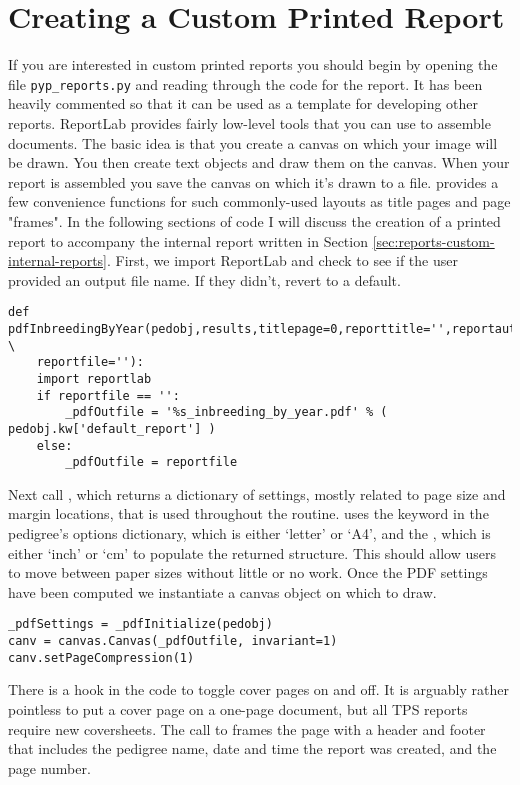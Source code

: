 \section{Creating a Custom Printed Report}
\label{sec:reports-custom-printed-reports}
If you are interested in custom printed reports you should begin by opening the file \texttt{pyp\_reports.py} and reading
through the code for the  report.  It has been heavily commented so that it can be used as
a template for developing other reports.  ReportLab provides fairly low-level tools that you can use to assemble
documents.  The basic idea is that you create a canvas on which your image will be drawn.  You then create text objects and
draw them on the canvas.  When your report is assembled you save the canvas on which it's drawn to a file.  \PyPedal{} provides
a few convenience functions for such commonly-used layouts as title pages and page "frames".  In the following sections of code I will discuss the creation of a  printed report to accompany the
 internal report written in Section \ref{sec:reports-custom-internal-reports}.  First, we import ReportLab and check to see if the user provided an output file name.  If they didn't, revert to a default.
\begin{verbatim}
def pdfInbreedingByYear(pedobj,results,titlepage=0,reporttitle='',reportauthor='', \
    reportfile=''):
    import reportlab
    if reportfile == '':
        _pdfOutfile = '%s_inbreeding_by_year.pdf' % ( pedobj.kw['default_report'] )
    else:
        _pdfOutfile = reportfile
\end{verbatim}
Next call , which returns a dictionary of settings, mostly related to page size and
margin locations, that is used throughout the routine.  \function{\_pdfInitialize()} uses the  keyword
in the pedigree's options dictionary, which is either `letter' or `A4', and the \member{default\_unit}, which is either
`inch' or `cm' to populate the returned structure.  This should allow users to move between paper sizes without little
or no work.  Once the PDF settings have been computed we instantiate a canvas object on which to draw.
\begin{verbatim}
_pdfSettings = _pdfInitialize(pedobj)
canv = canvas.Canvas(_pdfOutfile, invariant=1)
canv.setPageCompression(1)
\end{verbatim}
There is a hook in the code to toggle cover pages on and off.  It is arguably rather pointless to put a cover page on a one-page document, but all TPS reports require new coversheets.  The call to  frames the page with a header and footer that includes the pedigree name, date and time the report was created, and the page number.
